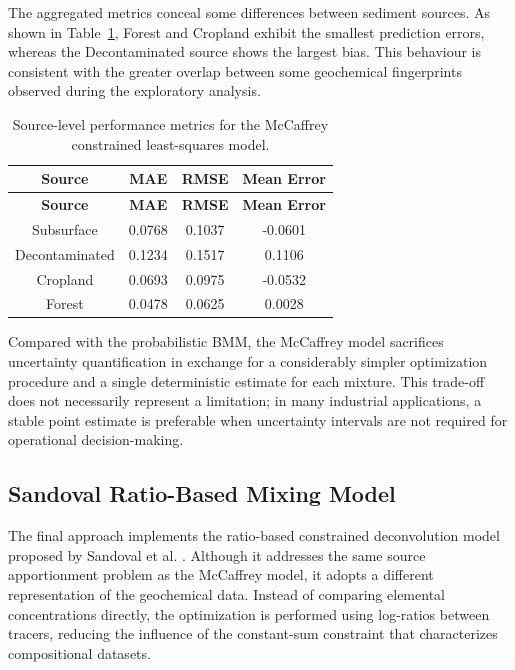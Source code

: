 \documentclass[
  12pt,
  letterpaper,
]{book}
\begin{document}
The aggregated metrics conceal some differences between sediment
sources. As shown in Table~\ref{tbl-mccaffrey-source-metrics}, Forest
and Cropland exhibit the smallest prediction errors, whereas the
Decontaminated source shows the largest bias. This behaviour is
consistent with the greater overlap between some geochemical
fingerprints observed during the exploratory analysis.

\begin{longtable}[]{@{}cccc@{}}
\caption{Source-level performance metrics for the McCaffrey constrained
least-squares model.}\label{tbl-mccaffrey-source-metrics}\tabularnewline
\toprule\noalign{}
\textbf{Source} & \textbf{MAE} & \textbf{RMSE} & \textbf{Mean Error} \\
\midrule\noalign{}
\endfirsthead
\toprule\noalign{}
\textbf{Source} & \textbf{MAE} & \textbf{RMSE} & \textbf{Mean Error} \\
\midrule\noalign{}
\endhead
\bottomrule\noalign{}
\endlastfoot
Subsurface & 0.0768 & 0.1037 & -0.0601 \\
Decontaminated & 0.1234 & 0.1517 & 0.1106 \\
Cropland & 0.0693 & 0.0975 & -0.0532 \\
Forest & 0.0478 & 0.0625 & 0.0028 \\
\end{longtable}

Compared with the probabilistic BMM, the McCaffrey model sacrifices
uncertainty quantification in exchange for a considerably simpler
optimization procedure and a single deterministic estimate for each
mixture. This trade-off does not necessarily represent a limitation; in
many industrial applications, a stable point estimate is preferable when
uncertainty intervals are not required for operational decision-making.

\subsection{Sandoval Ratio-Based Mixing
Model}\label{sandoval-ratio-based-mixing-model}

The final approach implements the ratio-based constrained deconvolution
model proposed by Sandoval et al.
. Although it addresses the
same source apportionment problem as the McCaffrey model, it adopts a
different representation of the geochemical data. Instead of comparing
elemental concentrations directly, the optimization is performed using
log-ratios between tracers, reducing the influence of the constant-sum
constraint that characterizes compositional datasets.
\end{document}
